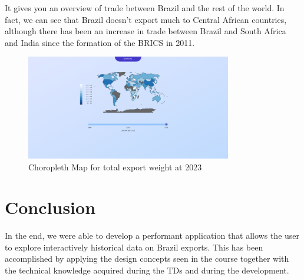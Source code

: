 \documentclass[12pt,a4]{article}
\begin{document}
It gives you an overview of trade between Brazil and the rest of the world. In fact, we can see that Brazil doesn't export much to Central African countries, although there has been an increase in trade between Brazil and South Africa and India since the formation of the BRICS in 2011.

\begin{figure}[H]
    \centering
    \includegraphics[width=0.8\textwidth]{choro.png}
    \caption{Choropleth Map for total export weight at 2023}
\end{figure}

\section{Conclusion}
In the end, we were able to develop a performant application that allows the user to explore interactively historical data on Brazil exports. This has been accomplished by applying the design concepts seen in the course together with the technical knowledge acquired during the TDs and during the development.
\end{document}
